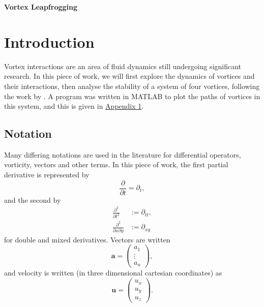 \documentclass[10pt, a4paper]{article}
\numberwithin{equation}{section}
\newcommand{\vel}{\bm{u}}
\begin{document}
\begin{center}
\textbf{\Large Vortex Leapfrogging} \\
\end{center}
\section{Introduction}
Vortex interactions are an area of fluid dynamics still undergoing significant research.
In this piece of work, we will first explore the dynamics of vortices and their interactions, then analyse the stability of a system of four vortices, following the work by \citet{acheson00}.
A program was written in MATLAB to plot the paths of vortices in this system, and this is given in \hyperref[sec:ap1]{Appendix 1}.
\subsection{Notation}
\label{sec:notation}
Many differing notations are used in the literature for differential operators, vorticity, vectors and other terms. In this piece of work, the first partial derivative is represented by
\begin{equation}
\label{eq:1partial}
\frac{\partial}{\partial t} = \partial _t,
\end{equation}
and the second by
\begin{align}
\label{eq:doublepartial}
\frac{\partial^2}{\partial t^2} &:= \partial_{tt},\\
\label{eq:mixedpartial}
\frac{\partial^2}{\partial x\partial y} &:= \partial_{xy}
\end{align}
for double and mixed derivatives. Vectors are written
\begin{equation}
\label{eq:vector}
\bm{a}=\left(\begin{array}{c} a_1\\\vdots\\a_n \end{array}\right),
\end{equation}
and velocity is written (in three dimensional cartesian coordinates) as
\begin{equation}
\label{eq:veloc}
\vel=\left(\begin{array}{c} u_x\\u_y\\u_z \end{array}\right).
\end{equation}
\end{document}

